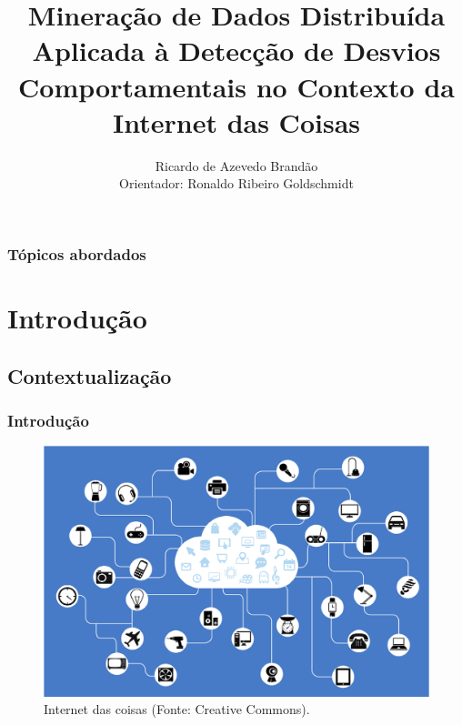 \documentclass[hyperref={pdfpagelabels=false}]{beamer}
\title{Mineração de Dados Distribuída Aplicada à Detecção de Desvios Comportamentais no Contexto da Internet das Coisas}
\author{Ricardo de Azevedo Brand\~{a}o \\ Orientador: Ronaldo Ribeiro Goldschmidt}
\institute {Mestrando em Sistemas e Computação \\ Instituto Militar de Engenharia }
\begin{document}
\begin{frame}
\titlepage
\end{frame} 

\begin{frame}
	\frametitle{Tópicos abordados}
	\footnotesize{\tableofcontents}
\end{frame} 

\section{Introdução}

\subsection{Contextualiza\c{c}\~{a}o}

\begin{frame}
	\frametitle{Introdução}
	\begin{figure}[h]
		\centering
		\includegraphics[scale=0.45]{img/IoT.png}
		\caption{\scriptsize{Internet das coisas (Fonte: Creative Commons).}}
		\label{fig:IoT}
	\end{figure}	

\end{frame}
\end{document}
